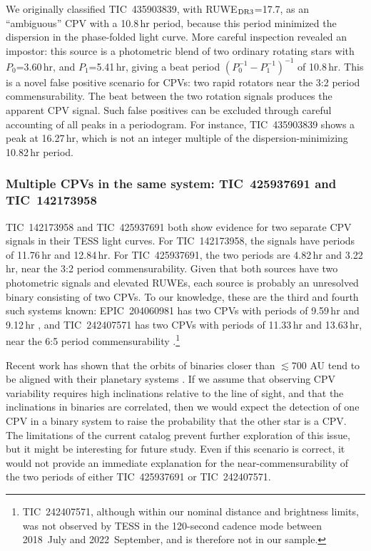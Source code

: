 \documentclass[11pt,twocolumn,tighten]{aastex63}
\begin{document}
We originally classified TIC~435903839, with RUWE$_{\rm DR3}$=17.7, as
an ``ambiguous'' CPV with a 10.8\,hr period, because this period
minimized the dispersion in the phase-folded light curve.  More
careful inspection revealed an impostor:
this source is a photometric blend of two ordinary rotating stars with
$P_0$=3.60\,hr, and $P_1$=5.41\,hr, giving a beat period $(P_0^{-1} -
P_1^{-1})^{-1}$ of 10.8\,hr.  This is a novel false positive scenario
for CPVs: two rapid rotators near the 3:2 period commensurability.
The beat between the two rotation signals produces the apparent CPV
signal.  Such false positives can be excluded through careful
accounting of all peaks in a periodogram.  For instance, TIC~435903839
shows a peak at 16.27\,hr, which is not an integer multiple of the
dispersion-minimizing 10.82\,hr period.

\subsubsection{Multiple CPVs in the same system: TIC~425937691 and TIC~142173958}

TIC~142173958 and TIC~425937691 both show evidence for two separate CPV
signals in their TESS light curves.  For TIC~142173958, the signals
have periods of 11.76\,hr and 12.84\,hr.  For TIC~425937691, the two
periods are 4.82\,hr and 3.22\,hr, near the 3:2 period commensurability.
Given that both sources have two photometric signals and elevated
RUWEs, each source is probably an unresolved binary consisting of two
CPVs.  To our knowledge, these are the third and fourth such systems
known: EPIC~204060981 has two CPVs with periods of 9.59\,hr and
9.12\,hr \citep{2018AJ....155...63S}, and TIC~242407571 has two CPVs
with periods of 11.33\,hr and 13.63\,hr, near the 6:5 period commensurability
\citep{2021AJ....161...60S}.\footnote{TIC~242407571, although within
our nominal distance and brightness limits, was not observed by TESS
in the 120-second cadence mode between 2018~July and 2022~September, and is therefore not in our sample.}

Recent work has shown that the orbits of binaries closer than
$\lesssim$700 AU tend to be aligned with their planetary systems
\citep[e.g.][]{2022AJ....163..207C}.  If we assume that observing CPV
variability requires high inclinations relative to the line of sight,
and that the inclinations in binaries are correlated, then we would
expect the detection of one CPV in a binary system to raise the
probability that the other star is a CPV.  The limitations of the
current catalog prevent further exploration of this issue, but it
might be interesting for future study.  Even if this scenario is
correct, it would not provide an immediate explanation for the
near-commensurability of the two periods of either TIC~425937691 
or TIC~242407571.
\end{document}
